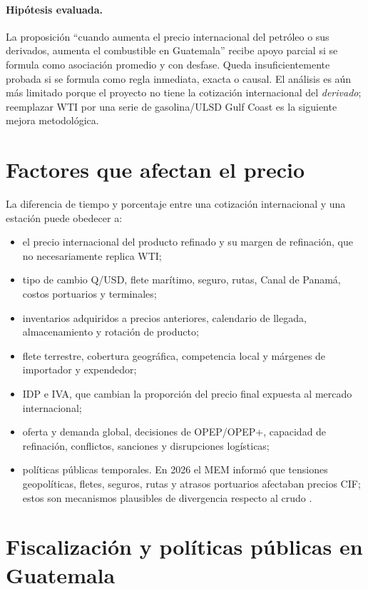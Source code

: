 \documentclass[11pt,letterpaper]{article}
\begin{document}
\paragraph{Hipótesis evaluada.} La proposición ``cuando aumenta el precio internacional del petróleo o sus derivados, aumenta el combustible en Guatemala'' recibe apoyo parcial si se formula como asociación promedio y con desfase. Queda insuficientemente probada si se formula como regla inmediata, exacta o causal. El análisis es aún más limitado porque el proyecto no tiene la cotización internacional del \emph{derivado}; reemplazar WTI por una serie de gasolina/ULSD Gulf Coast es la siguiente mejora metodológica.

\section{Factores que afectan el precio}
La diferencia de tiempo y porcentaje entre una cotización internacional y una estación puede obedecer a:
\begin{itemize}
  \item el precio internacional del producto refinado y su margen de refinación, que no necesariamente replica WTI;
  \item tipo de cambio Q/USD, flete marítimo, seguro, rutas, Canal de Panamá, costos portuarios y terminales;
  \item inventarios adquiridos a precios anteriores, calendario de llegada, almacenamiento y rotación de producto;
  \item flete terrestre, cobertura geográfica, competencia local y márgenes de importador y expendedor;
  \item IDP e IVA, que cambian la proporción del precio final expuesta al mercado internacional;
  \item oferta y demanda global, decisiones de OPEP/OPEP+, capacidad de refinación, conflictos, sanciones y disrupciones logísticas;
  \item políticas públicas temporales. En 2026 el MEM informó que tensiones geopolíticas, fletes, seguros, rutas y atrasos portuarios afectaban precios CIF; estos son mecanismos plausibles de divergencia respecto al crudo \parencite{memFactores2026}.
\end{itemize}

\section{Fiscalización y políticas públicas en Guatemala}
\end{document}
